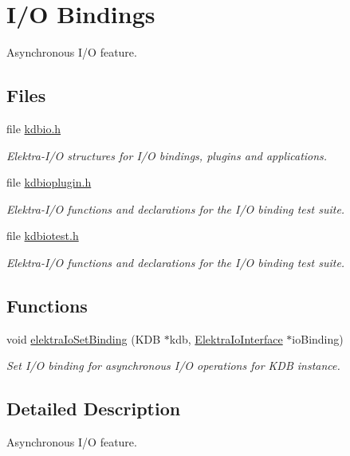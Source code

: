 \hypertarget{group__kdbio}{}\section{I/O Bindings}
\label{group__kdbio}


Asynchronous I/O feature.  


\subsection*{Files}
\begin{DoxyCompactItemize}
\item 
file \hyperlink{kdbio_8h}{kdbio.\+h}
\begin{DoxyCompactList}\small\item\em Elektra-\/\+I/O structures for I/O bindings, plugins and applications. \end{DoxyCompactList}\item 
file \hyperlink{kdbioplugin_8h}{kdbioplugin.\+h}
\begin{DoxyCompactList}\small\item\em Elektra-\/\+I/O functions and declarations for the I/O binding test suite. \end{DoxyCompactList}\item 
file \hyperlink{kdbiotest_8h}{kdbiotest.\+h}
\begin{DoxyCompactList}\small\item\em Elektra-\/\+I/O functions and declarations for the I/O binding test suite. \end{DoxyCompactList}\end{DoxyCompactItemize}
\subsection*{Functions}
\begin{DoxyCompactItemize}
\item 
void \hyperlink{group__kdbio_ga187345483bdfbb404919c6797bc2db77}{elektra\+Io\+Set\+Binding} (K\+DB $\ast$kdb, \hyperlink{kdbio_8h_aabcd87b8c09d4d4c1033fc1baa417391}{Elektra\+Io\+Interface} $\ast$io\+Binding)
\begin{DoxyCompactList}\small\item\em Set I/O binding for asynchronous I/O operations for K\+DB instance. \end{DoxyCompactList}\end{DoxyCompactItemize}


\subsection{Detailed Description}
Asynchronous I/O feature. 

